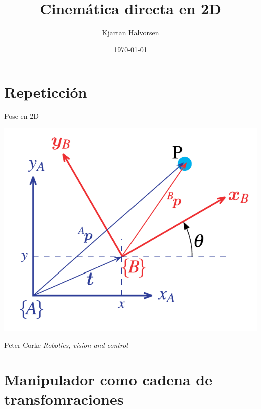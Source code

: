 \documentclass[presentation,aspectratio=169]{beamer}
\author{Kjartan Halvorsen}
\date{\today}
\title{Cinemática directa en 2D}
\begin{document}
\maketitle

\section{Repeticción}
\label{sec:orga33cdfc}
\begin{frame}[label={sec:orgcd027e4}]{Pose en 2D}
\begin{center}
\includegraphics[height=0.5\textheight]{../figures/Corke-fig2.6.png}

\footnotesize Peter Corke \emph{Robotics, vision and control}
\end{center}
\end{frame}

\section{Manipulador como cadena de transfomraciones}
\label{sec:org69df853}
\end{document}
